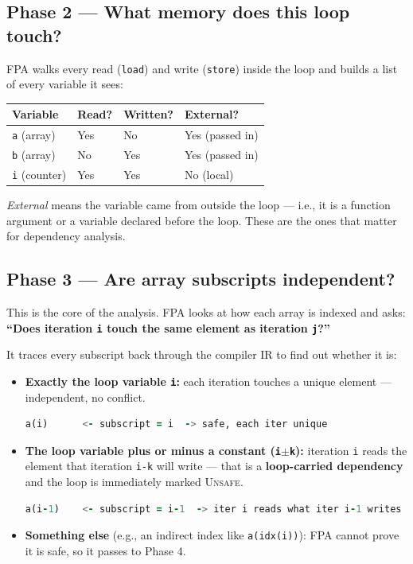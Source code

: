 \documentclass[12pt,a4paper]{article}
\begin{document}
\subsection{Phase 2 --- What memory does this loop touch?}

FPA walks every read (\texttt{load}) and write (\texttt{store}) inside
the loop and builds a list of every variable it sees:

\begin{center}
\begin{tabular}{llll}
\toprule
\textbf{Variable} & \textbf{Read?} & \textbf{Written?} & \textbf{External?} \\
\midrule
\texttt{a} (array)   & Yes & No  & Yes (passed in) \\
\texttt{b} (array)   & No  & Yes & Yes (passed in) \\
\texttt{i} (counter) & Yes & Yes & No  (local)     \\
\bottomrule
\end{tabular}
\end{center}

\textit{External} means the variable came from outside the loop ---
i.e., it is a function argument or a variable declared before the loop.
These are the ones that matter for dependency analysis.

\subsection{Phase 3 --- Are array subscripts independent?}

This is the core of the analysis. FPA looks at how each array is
indexed and asks: \textbf{``Does iteration \texttt{i} touch the same
element as iteration \texttt{j}?''}

It traces every subscript back through the compiler IR to find out
whether it is:

\begin{itemize}[leftmargin=1.5em]
  \item \textbf{Exactly the loop variable \texttt{i}:} each iteration
        touches a unique element --- independent, no conflict.

  \begin{lstlisting}[language=Fortran]
  a(i)      <- subscript = i  -> safe, each iter unique
  \end{lstlisting}

  \item \textbf{The loop variable plus or minus a constant (\texttt{i$\pm$k}):}
        iteration \texttt{i} reads the element that iteration
        \texttt{i-k} will write --- that is a
        \textbf{loop-carried dependency} and the loop is immediately
        marked \textsc{Unsafe}.

  \begin{lstlisting}[language=Fortran]
  a(i-1)    <- subscript = i-1  -> iter i reads what iter i-1 writes
  \end{lstlisting}

  \item \textbf{Something else} (e.g., an indirect index like
        \texttt{a(idx(i))}): FPA cannot prove it is safe, so it passes
        to Phase 4.
\end{itemize}
\end{document}
